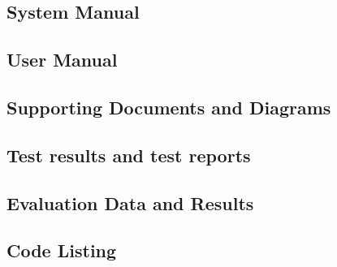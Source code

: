 \documentclass{report}
\begin{document}
\subsection{System Manual}
\subsection{User Manual}
\subsection{Supporting Documents and Diagrams}
\subsection{Test results and test reports}
\subsection{Evaluation Data and Results}
\subsection{Code Listing}
\end{document}
